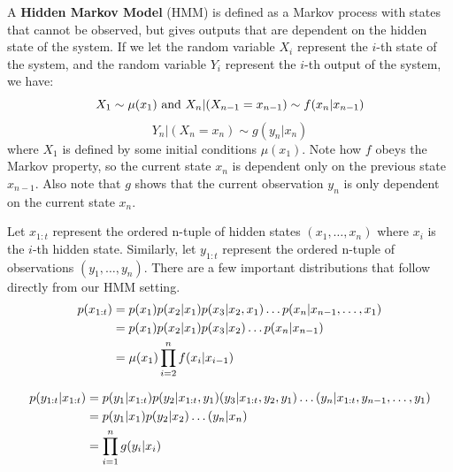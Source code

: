 \documentclass{article}
\begin{document}
A \textbf{Hidden Markov Model} (HMM) is defined as a Markov process with states that cannot be observed, but gives outputs that are dependent on the hidden state of the system. If we let the random variable $X_i$ represent the $i$-th state of the system, and the random variable $Y_i$ represent the $i$-th output of the system, we have:
\begin{equation}
X_1 \sim \mu (x_1) \textnormal{ and } X_n|(X_{n-1}=x_{n-1}) \sim f(x_n|x_{n-1})
\end{equation}
\begin{equation}
Y_n|(X_n = x_n) \sim g(y_n|x_n)
\end{equation}
where $X_1$ is defined by some initial conditions $\mu(x_1)$. Note how $f$ obeys the Markov property, so the current state $x_n$ is dependent only on the previous state $x_{n-1}$. Also note that $g$ shows that the current observation $y_n$ is only dependent on the current state $x_n$.

Let $x_{1:t}$ represent the ordered n-tuple of hidden states $(x_1,\dots,x_n)$ where $x_i$ is the $i$-th hidden state. Similarly, let $y_{1:t}$ represent the ordered n-tuple of observations $(y_1,\dots,y_n)$. There are a few important distributions that follow directly from our HMM setting.
\begin{equation} \label{p(x_{1:t})}
\begin{split}
p(x_{1:t})
&= p(x_1)p(x_2|x_1)p(x_3|x_2,x_1)\dots p(x_n|x_{n-1},\dots,x_1)\\
&= p(x_1)p(x_2|x_1)p(x_3|x_2)\dots p(x_n|x_{n-1})\\
&=\mu(x_1)\prod_{i=2}^{n} f(x_i|x_{i-1})\\
\end{split}
\end{equation}

\begin{equation} \label{p(y_{1:t}|x_{1:t})}
\begin{split}
p(y_{1:t}|x_{1:t})
&= p(y_1|x_{1:t})p(y_2|x_{1:t},y_1)(y_3|x_{1:t},y_2,y_1)\dots (y_n|x_{1:t},y_{n-1},\dots,y_1)\\
&= p(y_1|x_1)p(y_2|x_2)\dots (y_n|x_n)\\
&= \prod_{i=1}^{n} g(y_i|x_i)\\
\end{split}
\end{equation}
\end{document}
